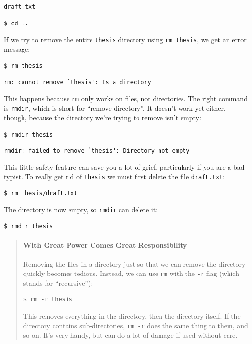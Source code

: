 \documentclass{book}
\begin{document}
\begin{verbatim}
draft.txt
\end{verbatim}

\begin{verbatim}
$ cd ..
\end{verbatim}

If we try to remove the entire \texttt{thesis} directory using
\texttt{rm thesis}, we get an error message:

\begin{verbatim}
$ rm thesis
\end{verbatim}

\begin{verbatim}
rm: cannot remove `thesis': Is a directory
\end{verbatim}

This happens because \texttt{rm} only works on files, not directories.
The right command is \texttt{rmdir}, which is short for ``remove
directory''. It doesn't work yet either, though, because the directory
we're trying to remove isn't empty:

\begin{verbatim}
$ rmdir thesis
\end{verbatim}

\begin{verbatim}
rmdir: failed to remove `thesis': Directory not empty
\end{verbatim}

This little safety feature can save you a lot of grief, particularly if
you are a bad typist. To really get rid of \texttt{thesis} we must first
delete the file \texttt{draft.txt}:

\begin{verbatim}
$ rm thesis/draft.txt
\end{verbatim}

The directory is now empty, so \texttt{rmdir} can delete it:

\begin{verbatim}
$ rmdir thesis
\end{verbatim}

\begin{quote}
\mbox{}\paragraph{With Great Power Comes Great Responsibility}

Removing the files in a directory just so that we can remove the
directory quickly becomes tedious. Instead, we can use \texttt{rm} with
the \texttt{-r} flag (which stands for ``recursive''):

\begin{verbatim}
$ rm -r thesis
\end{verbatim}

This removes everything in the directory, then the directory itself. If
the directory contains sub-directories, \texttt{rm -r} does the same
thing to them, and so on. It's very handy, but can do a lot of damage if
used without care.
\end{quote}
\end{document}
